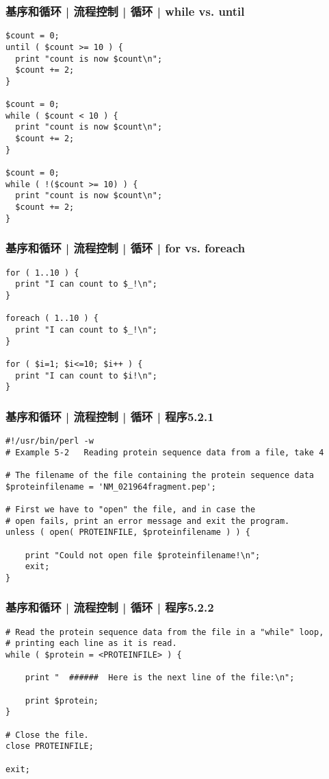 \begin{frame}[fragile]
  \frametitle{基序和循环 | 流程控制 | 循环 | while vs. until}
\begin{lstlisting}[basicstyle=\small\tt]
$count = 0;
until ( $count >= 10 ) {
  print "count is now $count\n";
  $count += 2;
}

$count = 0;
while ( $count < 10 ) {
  print "count is now $count\n";
  $count += 2;
}

$count = 0;
while ( !($count >= 10) ) {
  print "count is now $count\n";
  $count += 2;
}
\end{lstlisting}
\end{frame}

\begin{frame}[fragile]
  \frametitle{基序和循环 | 流程控制 | 循环 | for vs. foreach}
\begin{lstlisting}
for ( 1..10 ) {
  print "I can count to $_!\n";
}

foreach ( 1..10 ) {
  print "I can count to $_!\n";
}

for ( $i=1; $i<=10; $i++ ) {
  print "I can count to $i!\n";
}
\end{lstlisting}
\end{frame}

\begin{frame}[fragile]
  \frametitle{基序和循环 | 流程控制 | 循环 | 程序5.2.1}
\begin{lstlisting}[basicstyle=\small\tt]
#!/usr/bin/perl -w
# Example 5-2   Reading protein sequence data from a file, take 4

# The filename of the file containing the protein sequence data
$proteinfilename = 'NM_021964fragment.pep';

# First we have to "open" the file, and in case the
# open fails, print an error message and exit the program.
unless ( open( PROTEINFILE, $proteinfilename ) ) {

    print "Could not open file $proteinfilename!\n";
    exit;
}
\end{lstlisting}  
\end{frame}

\begin{frame}[fragile]
  \frametitle{基序和循环 | 流程控制 | 循环 | 程序5.2.2}
\begin{lstlisting}[firstnumber=15]
# Read the protein sequence data from the file in a "while" loop,
# printing each line as it is read.
while ( $protein = <PROTEINFILE> ) {

    print "  ######  Here is the next line of the file:\n";

    print $protein;
}

# Close the file.
close PROTEINFILE;

exit;
\end{lstlisting}  
\end{frame}

